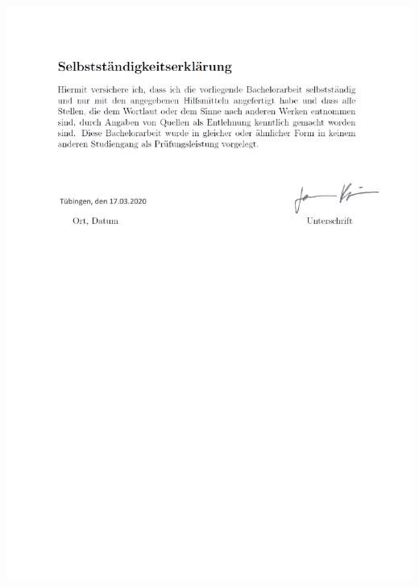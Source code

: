 \documentclass[twoside,12pt,a4paper]{report}
\begin{document}
\hspace*{-4.5cm}\includegraphics[page = 1]{figures/Selbststaendigkeitserklaerung.pdf}
\end{document}
